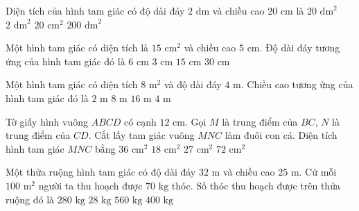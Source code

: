 \begin{ex} %
Diện tích của hình tam giác có độ dài đáy $2\text{ dm}$ và chiều cao $20\text{ cm}$ là
\choice
{$20\text{ dm}^2$}
{\True $2\text{ dm}^2$}
{$20\text{ cm}^2$}
{$200\text{ dm}^2$}
\end{ex}

\begin{ex} %
Một hình tam giác có diện tích là $15\text{ cm}^2$ và chiều cao $5\text{ cm}$. Độ dài đáy tương ứng của hình tam giác đó là
\choice
{\True $6\text{ cm}$}
{$3\text{ cm}$}
{$15\text{ cm}$}
{$30\text{ cm}$}
\end{ex}

\begin{ex} %
Một hình tam giác có diện tích $8\text{ m}^2$ và độ dài đáy $4\text{ m}$. Chiều cao tương ứng của hình tam giác đó là
\choice
{$2\text{ m}$}
{$8\text{ m}$}
{$16\text{ m}$}
{\True $4\text{ m}$}
\end{ex}

\begin{ex} %
Tờ giấy hình vuông $ABCD$ có cạnh $12\text{ cm}$. Gọi $M$ là trung điểm của $BC$, $N$ là trung điểm của $CD$. Cắt lấy tam giác vuông $MNC$ làm đuôi con cá. Diện tích hình tam giác $MNC$ bằng
\choice
{$36\text{ cm}^2$}
{\True $18\text{ cm}^2$}
{$27\text{ cm}^2$}
{$72\text{ cm}^2$}
\end{ex}

\begin{ex} %
Một thửa ruộng hình tam giác có độ dài đáy $32\text{ m}$ và chiều cao $25\text{ m}$. Cứ mỗi $100\text{ m}^2$ người ta thu hoạch được $70\text{ kg}$ thóc. Số thóc thu hoạch được trên thửa ruộng đó là
\choice
{\True $280\text{ kg}$}
{$28\text{ kg}$}
{$560\text{ kg}$}
{$400\text{ kg}$}
\end{ex}

